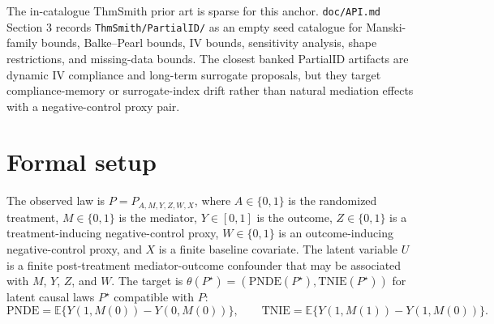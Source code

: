 \documentclass[11pt]{article}
\newcommand{\E}{\mathbb{E}}
\theoremstyle{definition}
\theoremstyle{plain}
\theoremstyle{remark}
\begin{document}
The in-catalogue ThmSmith prior art is sparse for this anchor.  \texttt{doc/API.md} Section 3 records \texttt{ThmSmith/PartialID/} as an empty seed catalogue for Manski-family bounds, Balke--Pearl bounds, IV bounds, sensitivity analysis, shape restrictions, and missing-data bounds.  The closest banked PartialID artifacts are dynamic IV compliance and long-term surrogate proposals, but they target compliance-memory or surrogate-index drift rather than natural mediation effects with a negative-control proxy pair.

\section{Formal setup}
The observed law is \(P=P_{A,M,Y,Z,W,X}\), where \(A\in\{0,1\}\) is the randomized treatment, \(M\in\{0,1\}\) is the mediator, \(Y\in[0,1]\) is the outcome, \(Z\in\{0,1\}\) is a treatment-inducing negative-control proxy, \(W\in\{0,1\}\) is an outcome-inducing negative-control proxy, and \(X\) is a finite baseline covariate.  The latent variable \(U\) is a finite post-treatment mediator-outcome confounder that may be associated with \(M\), \(Y\), \(Z\), and \(W\).  The target is \(\theta(P^\star)=(\mathrm{PNDE}(P^\star),\mathrm{TNIE}(P^\star))\) for latent causal laws \(P^\star\) compatible with \(P\):
\[
\mathrm{PNDE}=\E\{Y(1,M(0))-Y(0,M(0))\},\qquad
\mathrm{TNIE}=\E\{Y(1,M(1))-Y(1,M(0))\}.
\]
\end{document}
